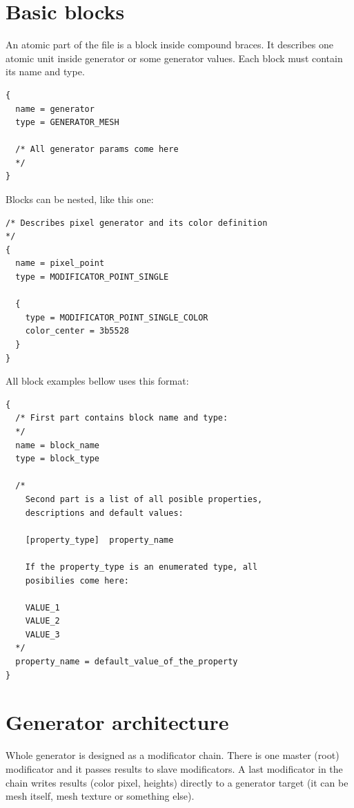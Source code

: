 \documentclass[9pt]{article}
\begin{document}
\section{Basic blocks}
An atomic part of the file is a block inside compound braces. It describes one 
atomic unit inside generator or some generator values. Each block must
contain its name and type.
\begin{verbatim}
{
  name = generator
  type = GENERATOR_MESH

  /* All generator params come here
  */
}
\end{verbatim}
Blocks can be nested, like this one:
\begin{verbatim}
/* Describes pixel generator and its color definition
*/
{
  name = pixel_point
  type = MODIFICATOR_POINT_SINGLE

  {
    type = MODIFICATOR_POINT_SINGLE_COLOR
    color_center = 3b5528
  }
}
\end{verbatim}
All block examples bellow uses this format:
\begin{verbatim}
{
  /* First part contains block name and type:
  */
  name = block_name
  type = block_type

  /*
    Second part is a list of all posible properties,
    descriptions and default values:

    [property_type]  property_name
   
    If the property_type is an enumerated type, all 
    posibilies come here:
    
    VALUE_1
    VALUE_2
    VALUE_3
  */  
  property_name = default_value_of_the_property  
}
\end{verbatim}

\section{Generator architecture}
Whole generator is designed as a modificator chain. There is one master (root)
modificator and it passes results to slave modificators. A last modificator 
in the chain writes results (color pixel, heights) directly to a generator target
(it can be mesh itself, mesh texture or something else).

\clearpage
\end{document}
